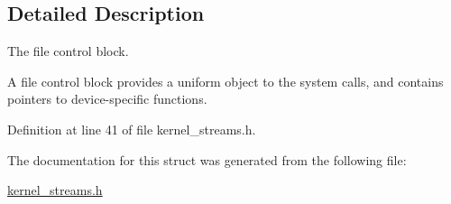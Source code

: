 \subsection{Detailed Description}
The file control block. 

A file control block provides a uniform object to the system calls, and contains pointers to device-\/specific functions. 

Definition at line 41 of file kernel\+\_\+streams.\+h.



The documentation for this struct was generated from the following file\+:\begin{DoxyCompactItemize}
\item 
\hyperlink{kernel__streams_8h}{kernel\+\_\+streams.\+h}\end{DoxyCompactItemize}
